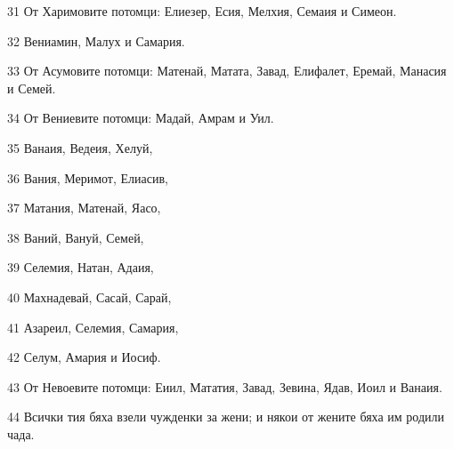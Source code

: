\par 31 От Харимовите потомци: Елиезер, Есия, Мелхия, Семаия и Симеон.
\par 32 Вениамин, Малух и Самария.
\par 33 От Асумовите потомци: Матенай, Матата, Завад, Елифалет, Еремай, Манасия и Семей.
\par 34 От Вениевите потомци: Мадай, Амрам и Уил.
\par 35 Ванаия, Ведеия, Хелуй,
\par 36 Вания, Меримот, Елиасив,
\par 37 Матания, Матенай, Яасо,
\par 38 Ваний, Вануй, Семей,
\par 39 Селемия, Натан, Адаия,
\par 40 Махнадевай, Сасай, Сарай,
\par 41 Азареил, Селемия, Самария,
\par 42 Селум, Амария и Иосиф.
\par 43 От Невоевите потомци: Еиил, Мататия, Завад, Зевина, Ядав, Иоил и Ванаия.
\par 44 Всички тия бяха взели чужденки за жени; и някои от жените бяха им родили чада.


